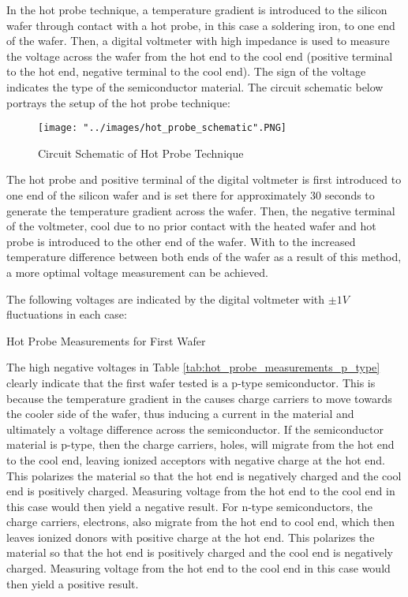 \documentclass{article}
\begin{document}
	\FloatBarrier
	
	In the hot probe technique, a temperature gradient is introduced to the silicon wafer through contact with a hot probe, in this case a soldering iron, to one end of the wafer. Then, a digital voltmeter with high impedance is used to measure the voltage across the wafer from the hot end to the cool end (positive terminal to the hot end, negative terminal to the cool end). The sign of the voltage indicates the type of the semiconductor material. The circuit schematic below portrays the setup of the hot probe technique:

	\FloatBarrier
	
	\begin{figure}[h!]
		\centering
		\texttt{[image: "../images/hot\_probe\_schematic".PNG]}
		\caption{Circuit Schematic of Hot Probe Technique}
		\label{fig:hot_probe_schematic}
	\end{figure}

	\FloatBarrier
	
	The hot probe and positive terminal of the digital voltmeter is first introduced to one end of the silicon wafer and is set there for approximately 30 seconds to generate the temperature gradient across the wafer. Then, the negative terminal of the voltmeter, cool due to no prior contact with the heated wafer and hot probe is introduced to the other end of the wafer. With to the increased temperature difference between both ends of the wafer as a result of this method, a more optimal voltage measurement can be achieved.
	
	The following voltages are indicated by the digital voltmeter with $\pm 1 V$ fluctuations in each case:
	
	\FloatBarrier

	\begin{table}[h!]
		\centering
		\caption{Hot Probe Measurements for First Wafer}
		\label{tab:hot_probe_measurements_p_type}
	\end{table}

	\FloatBarrier
	
	The high negative voltages in Table \ref{tab:hot_probe_measurements_p_type} clearly indicate that the first wafer tested is a p-type semiconductor. This is because the temperature gradient in the causes charge carriers to move towards the cooler side of the wafer, thus inducing a current in the material and ultimately a voltage difference across the semiconductor. If the semiconductor material is p-type, then the charge carriers, holes, will migrate from the hot end to the cool end, leaving ionized acceptors with negative charge at the hot end. This polarizes the material so that the hot end is negatively charged and the cool end is positively charged. Measuring voltage from the hot end to the cool end in this case would then yield a negative result. For n-type semiconductors, the charge carriers, electrons, also migrate from the hot end to cool end, which then leaves ionized donors with positive charge at the hot end. This polarizes the material so that the hot end is positively charged and the cool end is negatively charged. Measuring voltage from the hot end to the cool end in this case would then yield a positive result.
	
\end{document}
